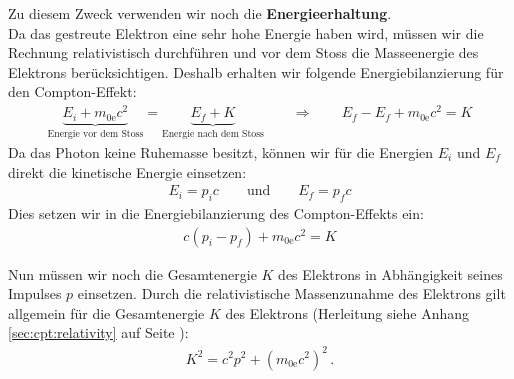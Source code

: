 \documentclass[a4paper, 10pt]{scrbook}
\newcommand\el{\text{e}}
\begin{document}
Zu diesem Zweck verwenden wir noch die {\bfseries Energieerhaltung}.\\
Da das gestreute Elektron eine sehr hohe Energie haben wird, müssen wir die Rechnung relativistisch durchführen und vor dem Stoss die Masseenergie des Elektrons berücksichtigen.
Deshalb erhalten wir folgende Energiebilanzierung für den Compton-Effekt:
\begin{align*}
  \underbrace{E_i + m_{0\el} c^2}_{\text{Energie vor dem Stoss}} = \underbrace{E_f + K}_{\text{Energie nach dem Stoss}} \qquad \Rightarrow\qquad E_f - E_f + m_{0\el} c^2 = K
\end{align*}
Da das Photon keine Ruhemasse besitzt, können wir für die Energien $E_i$ und $E_f$ direkt die kinetische Energie einsetzen:
\begin{align*}
  E_i = p_i c \qquad\text{und}\qquad E_f = p_f c
\end{align*}
Dies setzen wir in die Energiebilanzierung des Compton-Effekts ein:
\begin{align}
  c\left(  p_i - p_f \right) + m_{0\el} c^2 = K
  \label{equ:cpt:EnergieErhaltung}
\end{align}

Nun müssen wir noch die Gesamtenergie $K$ des Elektrons in Abhängigkeit seines Impulses $p$ einsetzen.
Durch die relativistische Massenzunahme des Elektrons gilt allgemein für die Gesamtenergie $K$ des Elektrons (Herleitung siehe Anhang \ref{sec:cpt:relativity} auf Seite \pageref{sec:cpt:relativity}):
\begin{align}
  K^2 = c^2 p^2 + \left( m_{0\el} c^2\right)^2\, .
  \label{equ:cpt:EnergieImpuls}
\end{align}
\end{document}
